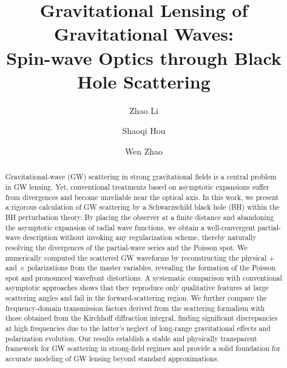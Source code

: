 \documentclass[reprint,amsmath,amssymb,aps,prd]{revtex4-2}
\begin{document}
\title{Gravitational Lensing of Gravitational Waves: \\Spin-wave Optics through Black Hole Scattering}

\author{Zhao Li}

\author{Shaoqi Hou}

\author{Wen Zhao}

\begin{abstract}
Gravitational-wave (GW) scattering in strong gravitational fields is a central problem in GW lensing. Yet, conventional treatments based on asymptotic expansions suffer from divergences and become unreliable near the optical axis. In this work, we present a rigorous calculation of GW scattering by a Schwarzschild black hole (BH) within the BH perturbation theory. By placing the observer at a finite distance and abandoning the asymptotic expansion of radial wave functions, we obtain a well-convergent partial-wave description without invoking any regularization scheme, thereby naturally resolving the divergences of the partial-wave series and the Poisson spot. We numerically computed the scattered GW waveforms by reconstructing the physical $+$ and $\times$ polarizations from the master variables, revealing the formation of the Poisson spot and pronounced wavefront distortions. 
A systematic comparison with conventional asymptotic approaches shows that they reproduce only qualitative features at large scattering angles and fail in the forward-scattering region. We further compare the frequency-domain transmission factors derived from the scattering formalism with those obtained from the Kirchhoff diffraction integral, finding significant discrepancies at high frequencies due to the latter's neglect of long-range gravitational effects and polarization evolution. Our results establish a stable and physically transparent framework for GW scattering in strong-field regimes and provide a solid foundation for accurate modeling of GW lensing beyond standard approximations.
\end{abstract}
\end{document}
